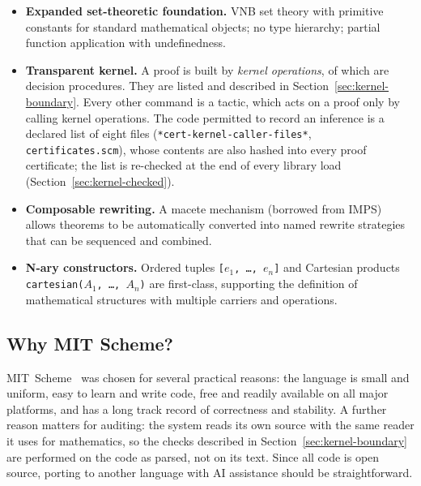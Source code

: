 \begin{itemize}
\item \textbf{Expanded set-theoretic foundation.}  VNB set theory with
  primitive constants for standard mathematical objects; no type
  hierarchy; partial function application with undefinedness.
\item \textbf{Transparent kernel.}  A proof is built by
  \VNBkernelopcount{} \emph{kernel operations}, of which
  \VNBkernelopcountoracle{} are decision procedures.  They are listed and
  described in Section~\ref{sec:kernel-boundary}.  Every other command is a
  tactic, which acts on a proof only by calling kernel operations.  The
  code permitted to record an inference is a declared list of eight files
  (\texttt{*cert-kernel-caller-files*}, \texttt{certificates.scm}), whose
  contents are also hashed into every proof certificate; the list is
  re-checked at the end of every library load
  (Section~\ref{sec:kernel-checked}).
\item \textbf{Composable rewriting.}  A macete mechanism (borrowed from
  IMPS) allows theorems to be automatically converted into named rewrite
  strategies that can be sequenced and combined.
\item \textbf{N-ary constructors.}  Ordered tuples \texttt{[$e_1$,
  \ldots, $e_n$]} and Cartesian products \texttt{cartesian($A_1$, \ldots,
  $A_n$)} are first-class, supporting the definition of mathematical
  structures with multiple carriers and operations.
\end{itemize}

\subsection{Why MIT Scheme?}

MIT~Scheme~\cite{MITScheme} was chosen for several practical reasons: the language is
small and uniform, easy to learn and write code, free and readily
available on all major platforms, and has a long track record of
correctness and stability.  A further reason matters for auditing: the
system reads its own source with the same reader it uses for
mathematics, so the checks described in
Section~\ref{sec:kernel-boundary} are performed on the code as parsed,
not on its text.  Since all code is
open source, porting to another language with AI assistance should be
straightforward.



